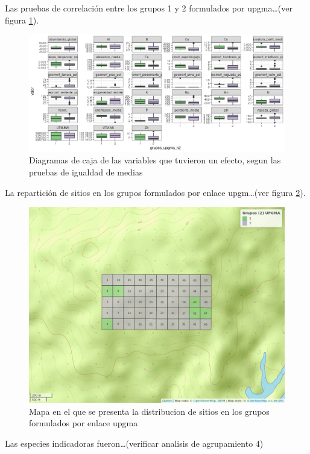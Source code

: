 \documentclass[11pt,]{article}
\begin{document}
Las pruebas de correlación entre los grupos 1 y 2 formulados por
upgma\ldots{}(ver figura \ref{fig:grupos_upgma}).

\begin{figure}
\centering
\includegraphics[width=1.00000\textwidth]{actualizacion2_grupos_upgma.png}
\caption{Diagramas de caja de las variables que tuvieron un efecto,
segun las pruebas de igualdad de medias\label{fig:grupos_upgma}}
\end{figure}

La repartición de sitios en los grupos formulados por enlace
upgm\ldots{}(ver figura \ref{fig:mapa_upgma_k2}).

\begin{figure}
\centering
\includegraphics{mapa_upgma_k2.png}
\caption{Mapa en el que se presenta la distribucion de sitios en los
grupos formulados por enlace upgma\label{fig:mapa_upgma_k2}}
\end{figure}

Las especies indicadoras fueron\ldots{}(verificar analisis de
agrupamiento 4)
\end{document}
